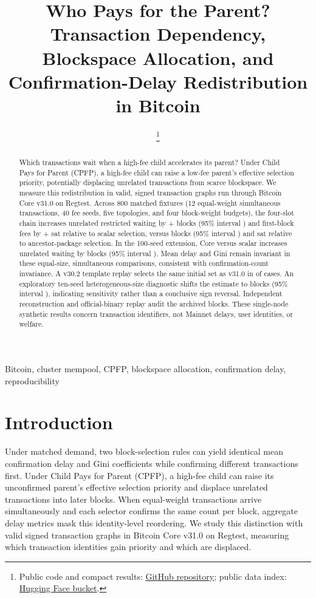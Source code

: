 \documentclass[conference]{IEEEtran}
\title{Who Pays for the Parent?\\Transaction Dependency, Blockspace Allocation, and Confirmation-Delay Redistribution in Bitcoin}
\author{\IEEEauthorblockN{Anonymous submission}}
\author{\IEEEauthorblockN{Anonymous submission}\thanks{Public code and compact results: \protect\href{https://github.com/computational-decision-lab/transaction-dependency-allocation}{GitHub repository}; public data index: \protect\href{https://huggingface.co/buckets/computational-decision-lab/transaction-dependency-allocation}{Hugging Face bucket}.}}
\begin{document}
\maketitle
\pagestyle{plain}
\begin{abstract}
Which transactions wait when a high-fee child accelerates its parent? Under Child Pays for Parent (CPFP), a high-fee child can raise a low-fee parent's effective selection priority, potentially displacing unrelated transactions from scarce blockspace. We measure this redistribution in valid, signed transaction graphs run through Bitcoin Core v31.0 on Regtest. Across 800 matched fixtures (12 equal-weight simultaneous transactions, 40 fee seeds, five topologies, and four block-weight budgets), the four-slot chain increases unrelated restricted waiting by +\ICBCFourChainDelay{} blocks (95\% interval \ICBCFourChainInterval{}) and first-block fees by +\ICBCFourChainFee{} sat relative to scalar selection, versus \ICBCFourChainAncestorDelay{} blocks (95\% interval \ICBCFourChainAncestorInterval{}) and \ICBCFourChainAncestorFee{} sat relative to ancestor-package selection. In the 100-seed extension, Core versus scalar increases unrelated waiting by \ICBCExtFourChainRU{} blocks (95\% interval \ICBCExtFourChainRUCI{}). Mean delay and Gini remain invariant in these equal-size, simultaneous comparisons, consistent with confirmation-count invariance. A v30.2 template replay selects the same initial set as v31.0 in \ICBCVersionMatchedSets{} of \ICBCReplayFixtures{} cases. An exploratory ten-seed heterogeneous-size diagnostic shifts the estimate to \ICBCDiagHeteroSimRU{} blocks (95\% interval \ICBCDiagHeteroSimRUCI{}), indicating sensitivity rather than a conclusive sign reversal. Independent reconstruction and official-binary replay audit the archived blocks. These single-node synthetic results concern transaction identifiers, not Mainnet delays, user identities, or welfare.
\end{abstract}
\begin{IEEEkeywords}
Bitcoin, cluster mempool, CPFP, blockspace allocation, confirmation delay, reproducibility
\end{IEEEkeywords}

\section{Introduction}
Under matched demand, two block-selection rules can yield identical mean confirmation delay and Gini coefficients while confirming different transactions first. Under Child Pays for Parent (CPFP), a high-fee child can raise its unconfirmed parent's effective selection priority and displace unrelated transactions into later blocks. When equal-weight transactions arrive simultaneously and each selector confirms the same count per block, aggregate delay metrics mask this identity-level reordering. We study this distinction with valid signed transaction graphs in Bitcoin Core v31.0 on Regtest, measuring which transaction identities gain priority and which are displaced.
\end{document}
